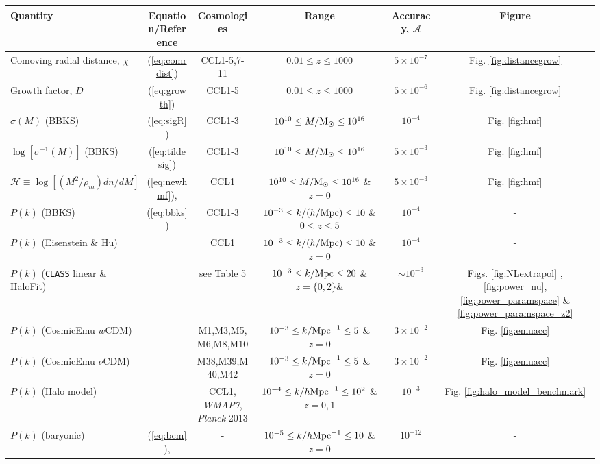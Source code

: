 
%
\begin{sidewaystable*}[!htp]
  \centering
  \begin{tabular}{ l|c c c c c}
    \hline
    Quantity & Equation/Reference & Cosmologies & Range & Accuracy, $\mathcal{A}$ & Figure \\
    \hline
    Comoving radial distance, $\chi$ & (\ref{eq:comrdist}) & CCL1-5,7-11 & $0.01 \leq z\leq 1000$ &  $5\times 10^{-7}$ & Fig. \ref{fig:distancegrow}\\
    Growth factor, $D$ & (\ref{eq:growth}) & CCL1-5 &  $0.01 \leq z\leq 1000 $ &  $5\times 10^{-6}$ & Fig. \ref{fig:distancegrow}\\
    $\sigma(M)$ (BBKS) & (\ref{eq:sigR}) & CCL1-3 &  $10^{10}\leq M/{\rm M}_\odot\leq 10^{16}$ &  $10^{-4}$ & Fig. \ref{fig:hmf}\\
    $\log[\sigma^{-1}(M)]$ (BBKS) & (\ref{eq:tildesig}) & CCL1-3 &  $10^{10}\leq M/{\rm M}_\odot\leq 10^{16}$ &  $5\times 10^{-3}$ & Fig. \ref{fig:hmf}\\
    $\mathcal H \equiv \log[(M^2/\bar{\rho}_m)dn/dM]$  & (\ref{eq:newhmf}), \citet{Tinker2010} & CCL1 & $10^{10}\leq M/{\rm M}_\odot\leq 10^{16}$ \& $z=0$ & $5\times 10^{-3}$ & Fig. \ref{fig:hmf}\\
    $P(k)$ (BBKS) & (\ref{eq:bbks}) & CCL1-3 & $10^{-3}\leq k/(h/{\rm Mpc})\leq 10$ \& $0\leq z\leq 5$ &  $10^{-4}$ & -\\
    $P(k)$ (Eisenstein \& Hu) & \citet{1998ApJ...496..605E}  & CCL1 & $10^{-3}\leq k/(h/{\rm Mpc})\leq 10$ \& $z=0$ & $10^{-4}$ & -\\
    $P(k)$ ({\tt CLASS} linear \& HaloFit) & \citet{CLASS_halofit}  & see Table 5 & $10^{-3}\leq k/{\rm Mpc}\leq 20$ \& $z=\{0,2\}$\&  & $\sim 10^{-3}$ & Figs. \ref{fig:NLextrapol} , \ref{fig:power_nu}, \ref{fig:power_paramspace} \& \ref{fig:power_paramspace_z2} \\
    $P(k)$ (CosmicEmu $w$CDM) & \citet{Lawrence17} & M1,M3,M5,M6,M8,M10 & $10^{-3}\leq k/{\rm Mpc}^{-1}\leq 5$ \& $z=0$  & $3\times 10^{-2}$ & Fig. \ref{fig:emuacc}\\
    $P(k)$ (CosmicEmu $\nu$CDM) & \citet{Lawrence17} & M38,M39,M40,M42 & $10^{-3}\leq k/{\rm Mpc}^{-1}\leq 5$ \& $z=0$ & $3\times 10^{-2}$ & Fig. \ref{fig:emuacc}\\
    $P(k)$ (Halo model) & \citet{Cooray2002} & CCL1, {\it WMAP7}, {\it Planck} 2013 & $10^{-4}\leq k/h{\rm Mpc}^{-1}\leq 10^{2}$ \& $z=0,1$ & $10^{-3}$ & Fig. \ref{fig:halo_model_benchmark}\\
    $P(k)$ (baryonic) & (\ref{eq:bcm}), \citet{Schneider15} &  - & $10^{-5}\leq k/h{\rm Mpc}^{-1}\leq 10$ \& $z=0$ & $10^{-12}$ & -\\

\end{tabular}
\end{sidewaystable*}
